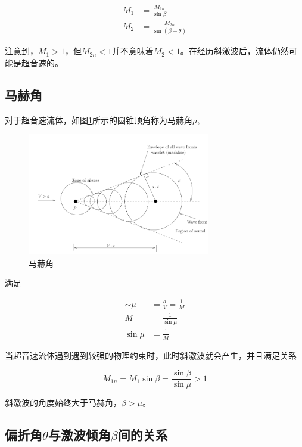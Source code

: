 \begin{align*}
    M_{1}&=\frac{M_{1 n}}{\sin \beta}\\ 
    M_{2}&=\frac{M_{2 n}}{\sin (\beta-\theta)}
\end{align*}

注意到，$M_1>1$，但$M_{2n}<1$并不意味着$M_2<1$。在经历斜激波后，流体仍然可能是超音速的。

\subsection{马赫角}

对于超音速流体，如图\ref{6}所示的圆锥顶角称为马赫角$\mu$,

\begin{figure}[!ht]
    \centering
    \includegraphics[width=8cm]{figures/6.png}
    \caption{马赫角}
    \label{6}
\end{figure}

满足

\begin{align*}
    \sim\mu&=\frac{a}{V}=\frac{1}{M}\\ 
    M&=\frac{1}{\sin\mu}\\ 
    \sin\mu&=\frac{1}{M}
\end{align*}

当超音速流体遇到遇到较强的物理约束时，此时斜激波就会产生，并且满足关系

\begin{equation*}
    M_{1 n}=M_{1} \sin \beta=\frac{\sin \beta}{\sin \mu}>1
\end{equation*}

斜激波的角度始终大于马赫角，$\beta>\mu$。

\subsection{偏折角$\theta$与激波倾角$\beta$间的关系}

